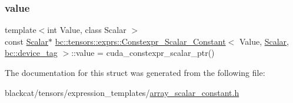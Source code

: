\subsubsection{\texorpdfstring{value}{value}}
{\footnotesize\ttfamily template$<$int Value, class Scalar $>$ \\
const \hyperlink{namespacebc_aa12ac55ee2c43dc082894dd3859daee1}{Scalar}$\ast$ \hyperlink{structbc_1_1tensors_1_1exprs_1_1Constexpr__Scalar__Constant}{bc\+::tensors\+::exprs\+::\+Constexpr\+\_\+\+Scalar\+\_\+\+Constant}$<$ Value, \hyperlink{namespacebc_aa12ac55ee2c43dc082894dd3859daee1}{Scalar}, \hyperlink{structbc_1_1device__tag}{bc\+::device\+\_\+tag} $>$\+::value = cuda\+\_\+constexpr\+\_\+scalar\+\_\+ptr()}



The documentation for this struct was generated from the following file\+:\begin{DoxyCompactItemize}
\item 
blackcat/tensors/expression\+\_\+templates/\hyperlink{array__scalar__constant_8h}{array\+\_\+scalar\+\_\+constant.\+h}\end{DoxyCompactItemize}
